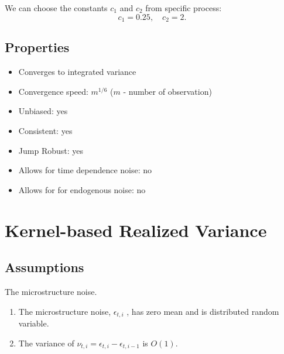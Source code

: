 \documentclass[letterpaper]{report}
\begin{document}
We can choose the constants $c_1$ and $c_2$ from specific process:
\begin{equation}
c_1 = 0.25, \quad
c_2 = 2.
\end{equation}
\subsection{Properties}
\begin{itemize}
\item Converges to integrated variance
\item Convergence speed: $m^{1/6}$ ($m$ - number of observation)
\item Unbiased: yes
\item Consistent: yes
\item Jump Robust: yes
\item Allows for time dependence noise: no
\item Allows for for endogenous noise: no
\end{itemize}


\section{Kernel-based Realized Variance}
\subsection{Assumptions}
The microstructure noise.
\begin{enumerate}
\item The microstructure noise, $\epsilon_{t,i}$ , has zero mean and is distributed random variable.
\item The variance of $\nu_{t,i} = \epsilon_{t,i} - \epsilon_{t,i-1}$ is
$O(1)$.
\end{enumerate}
\end{document}
